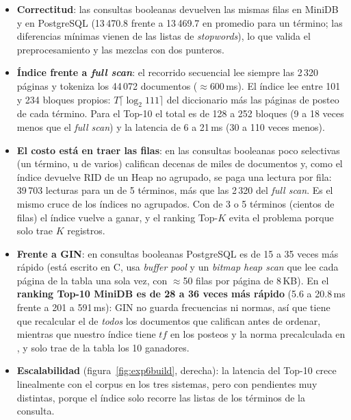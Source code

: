 \begin{itemize}
\item \textbf{Correctitud}: las consultas booleanas devuelven las mismas filas en MiniDB y en
  PostgreSQL (13\,470.8 frente a 13\,469.7 en promedio para un término; las diferencias mínimas
  vienen de las listas de \emph{stopwords}), lo que valida el preprocesamiento y las mezclas con dos
  punteros.
\item \textbf{Índice frente a \emph{full scan}}: el recorrido secuencial lee siempre las 2\,320
  páginas y tokeniza los 44\,072 documentos ($\approx$600\,ms). El índice lee entre 101 y 234 bloques
  propios: $T\lceil\log_2 111\rceil$ del diccionario más las páginas de posteo de cada término. Para
  el Top-10 el total es de 128 a 252 bloques (9 a 18 veces menos que el \emph{full scan}) y la
  latencia de 6 a 21\,ms (30 a 110 veces menos).
\item \textbf{El costo está en traer las filas}: en las consultas booleanas poco selectivas
  (un término, u  de varios) califican decenas de miles de documentos y, como el índice
  devuelve RID de un Heap no agrupado, se paga una lectura por fila: 39\,703 lecturas para un
   de 5 términos, más que las 2\,320 del \emph{full scan}. Es el mismo cruce de los índices
  no agrupados. Con  de 3 o 5 términos (cientos de filas) el índice vuelve a ganar, y el
  ranking Top-$K$ evita el problema porque solo trae $K$ registros.
\item \textbf{Frente a GIN}: en consultas booleanas PostgreSQL es de 15 a 35 veces más rápido (está
  escrito en C, usa \emph{buffer pool} y un \emph{bitmap heap scan} que lee cada página de la tabla
  una sola vez, con $\approx$50 filas por página de 8\,KB). En el \textbf{ranking Top-10 MiniDB es de
  28 a 36 veces más rápido} (5.6 a 20.8\,ms frente a 201 a 591\,ms): GIN no guarda frecuencias ni
  normas, así que  tiene que recalcular el  de \emph{todos} los
  documentos que califican antes de ordenar, mientras que nuestro índice tiene $tf$ en los posteos y
  la norma precalculada en , y solo trae de la tabla los 10 ganadores.
\item \textbf{Escalabilidad} (figura~\ref{fig:exp6build}, derecha): la latencia del Top-10 crece
  linealmente con el corpus en los tres sistemas, pero con pendientes muy distintas, porque el índice
  solo recorre las listas de los términos de la consulta.
\end{itemize}

